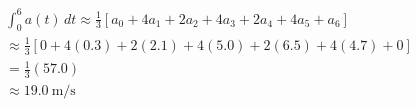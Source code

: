 \documentclass[preview]{standalone}
\begin{document}
\begin{align*}
\int_0^{6} a(t)\,dt \approx \frac{1}{3}\left[ a_0 + 4a_1 + 2a_2 + 4a_3 + 2a_4 + 4a_5 + a_6 \right] \\[4pt] \approx \frac{1}{3} \left[ 0 + 4(0.3) + 2(2.1) + 4(5.0) + 2(6.5) + 4(4.7) + 0 \right] \\[4pt] = \frac{1}{3}(57.0) \\[4pt] \approx 19.0\ \text{m/s}
\end{align*}
\end{document}
